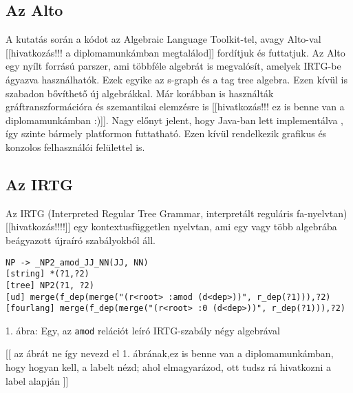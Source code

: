 \subsection{Az Alto}
A kutatás során a kódot az Algebraic Language Toolkit-tel, avagy Alto-val [[hivatkozás!!! a diplomamunkámban megtalálod]] fordítjuk és futtatjuk. Az Alto egy nyílt forrású parszer, ami többféle algebrát is megvalósít, amelyek IRTG-be ágyazva használhatók.
Ezek egyike az s-graph és a tag tree algebra. Ezen kívül is szabadon bővíthető új algebrákkal. Már korábban is használták gráftranszformációra és szemantikai elemzésre is [[hivatkozás!!! ez is benne van a diplomamunkámban :)]]. Nagy előnyt jelent, hogy Java-ban lett implementálva , így szinte bármely platformon futtatható. Ezen kívül rendelkezik grafikus és konzolos felhasználói felülettel is.


\subsection{Az IRTG}
Az IRTG (Interpreted Regular Tree Grammar, interpretált reguláris fa-nyelvtan) [[hivatkozás!!!!]] egy kontextusfüggetlen nyelvtan, ami egy vagy több algebrába beágyazott újraíró szabályokból áll.
\begin{verbatim}
NP -> _NP2_amod_JJ_NN(JJ, NN)
[string] *(?1,?2)
[tree] NP2(?1, ?2)
[ud] merge(f_dep(merge("(r<root> :amod (d<dep>))", r_dep(?1))),?2)
[fourlang] merge(f_dep(merge("(r<root> :0 (d<dep>))", r_dep(?1))),?2)
\end{verbatim}

1. ábra: Egy, az \texttt{amod} relációt leíró IRTG-szabály négy algebrával

[[ az ábrát ne így nevezd el 1. ábrának,ez is benne van a diplomamunkámban, hogy hogyan kell, a labelt nézd; ahol elmagyarázod, ott tudsz rá hivatkozni a label alapján ]]

